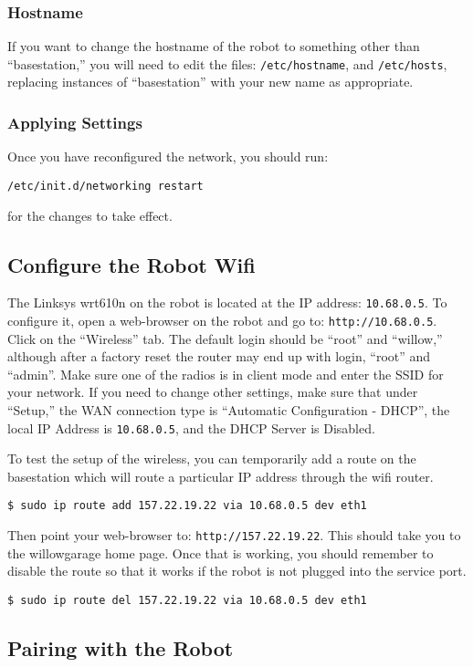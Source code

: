\subsubsection{Hostname}
If you want to change the hostname of the robot to something other
than ``basestation,'' you will need to edit the files:
\texttt{/etc/hostname}, and \texttt{/etc/hosts}, replacing instances
of ``basestation'' with your new name as appropriate.

\subsubsection{Applying Settings}
Once you have reconfigured the network, you should run:
\begin{verbatim}
/etc/init.d/networking restart
\end{verbatim}
for the changes to take effect.

\subsection{Configure the Robot Wifi}
The Linksys wrt610n on the robot is located at the IP address:
\texttt{10.68.0.5}. To configure it, open a web-browser on the robot
and go to: \texttt{http://10.68.0.5}.  Click on the
``Wireless'' tab.  The default login should be ``root'' and
``willow,'' although after a factory reset the router may end up with
login, ``root'' and ``admin''.  Make sure one of the radios is in
client mode and enter the SSID for your network.  If you need to
change other settings, make sure that under ``Setup,'' the WAN
connection type is ``Automatic Configuration - DHCP'', the local IP
Address is \texttt{10.68.0.5}, and the DHCP Server is Disabled.

To test the setup of the wireless, you can temporarily add a route on
the basestation which will route a particular IP address through the
wifi router.
\begin{verbatim}
$ sudo ip route add 157.22.19.22 via 10.68.0.5 dev eth1
\end{verbatim}
Then point your web-browser to:
\texttt{http://157.22.19.22}. This should take you to the
willowgarage home page.  Once that is working, you should remember to
disable the route so that it works if the robot is not plugged into
the service port.
\begin{verbatim}
$ sudo ip route del 157.22.19.22 via 10.68.0.5 dev eth1
\end{verbatim}

\subsection{Pairing with the Robot}

